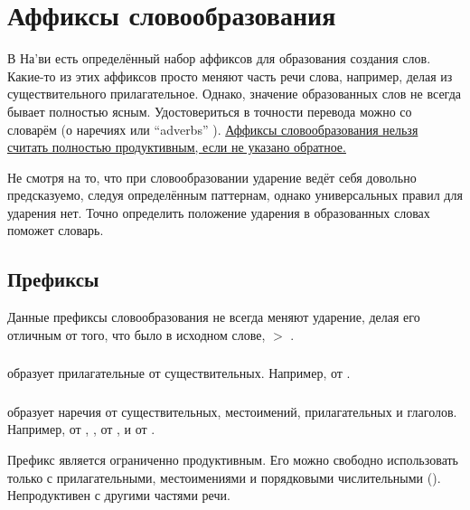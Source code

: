 
\section{Аффиксы словообразования}\label{lingop:affixes}
\noindent В На'ви есть определённый набор аффиксов для образования создания слов.
Какие-то из этих аффиксов просто меняют часть речи слова, например, делая из существительного прилагательное.  Однако, значение образованных слов не всегда бывает полностью ясным.  Удостовериться в точности перевода можно со словарём (о наречиях или ``adverbs'' ).  \uline{Аффиксы словообразования нельзя считать полностью продуктивным, если не указано обратное.}

Не смотря на то, что при словообразовании ударение ведёт себя довольно предсказуемо, следуя определённым паттернам, однако универсальных правил для ударения нет. Точно определить положение ударения в образованных словах поможет словарь.


\subsection{Префиксы} Данные префиксы словообразования не всегда меняют ударение, делая его отличным от того, что было в исходном слове,  
$>$  . 

\subsubsection{}  образует прилагательные от существительных. Например,
  от  .

\subsubsection{}  образует наречия от существительных, местоимений, прилагательных и глаголов. Например,   от
 ,  ,   от
 , и   от 
. 

Префикс  является ограниченно продуктивным. Его можно свободно использовать только с прилагательными, местоимениями и порядковыми числительными (). Непродуктивен с другими частями речи.

